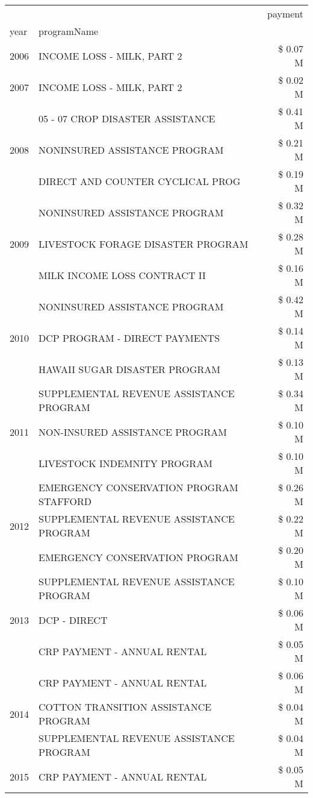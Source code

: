 \begin{tabular}{llr}
\toprule
 &  & payment \\
year & programName &  \\
\midrule
2006 & INCOME LOSS - MILK, PART 2 & \$ 0.07 M \\
\cline{1-3}
2007 & INCOME LOSS - MILK, PART 2 & \$ 0.02 M \\
\cline{1-3}
\multirow[t]{3}{*}{2008} & 05 - 07 CROP DISASTER ASSISTANCE & \$ 0.41 M \\
 & NONINSURED ASSISTANCE PROGRAM & \$ 0.21 M \\
 & DIRECT AND COUNTER CYCLICAL PROG & \$ 0.19 M \\
\cline{1-3}
\multirow[t]{3}{*}{2009} & NONINSURED ASSISTANCE PROGRAM & \$ 0.32 M \\
 & LIVESTOCK FORAGE DISASTER  PROGRAM & \$ 0.28 M \\
 & MILK INCOME LOSS CONTRACT II & \$ 0.16 M \\
\cline{1-3}
\multirow[t]{3}{*}{2010} & NONINSURED ASSISTANCE PROGRAM & \$ 0.42 M \\
 & DCP PROGRAM - DIRECT PAYMENTS & \$ 0.14 M \\
 & HAWAII SUGAR DISASTER PROGRAM & \$ 0.13 M \\
\cline{1-3}
\multirow[t]{3}{*}{2011} & SUPPLEMENTAL REVENUE ASSISTANCE PROGRAM & \$ 0.34 M \\
 & NON-INSURED ASSISTANCE PROGRAM & \$ 0.10 M \\
 & LIVESTOCK INDEMNITY PROGRAM & \$ 0.10 M \\
\cline{1-3}
\multirow[t]{3}{*}{2012} & EMERGENCY CONSERVATION PROGRAM STAFFORD & \$ 0.26 M \\
 & SUPPLEMENTAL REVENUE ASSISTANCE PROGRAM & \$ 0.22 M \\
 & EMERGENCY CONSERVATION PROGRAM & \$ 0.20 M \\
\cline{1-3}
\multirow[t]{3}{*}{2013} & SUPPLEMENTAL REVENUE ASSISTANCE PROGRAM & \$ 0.10 M \\
 & DCP - DIRECT & \$ 0.06 M \\
 & CRP PAYMENT - ANNUAL RENTAL & \$ 0.05 M \\
\cline{1-3}
\multirow[t]{3}{*}{2014} & CRP PAYMENT - ANNUAL RENTAL & \$ 0.06 M \\
 & COTTON TRANSITION ASSISTANCE PROGRAM & \$ 0.04 M \\
 & SUPPLEMENTAL REVENUE ASSISTANCE PROGRAM & \$ 0.04 M \\
\cline{1-3}
\multirow[t]{3}{*}{2015} & CRP PAYMENT - ANNUAL RENTAL & \$ 0.05 M \\

\end{tabular}
